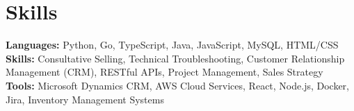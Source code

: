 \documentclass[11pt]{article}       %
\begin{document}
\vspace{-18.5pt}


\section*{Skills}
\textbf{Languages:} Python, Go, TypeScript, Java, JavaScript, MySQL, HTML/CSS\\
\textbf{Skills:} Consultative Selling, Technical Troubleshooting, Customer Relationship Management (CRM), RESTful APIs, Project Management, Sales Strategy\\
\textbf{Tools:} Microsoft Dynamics CRM, AWS Cloud Services, React, Node.js, Docker, Jira, Inventory Management Systems\\

\vspace{-6.5pt}
\end{document}
